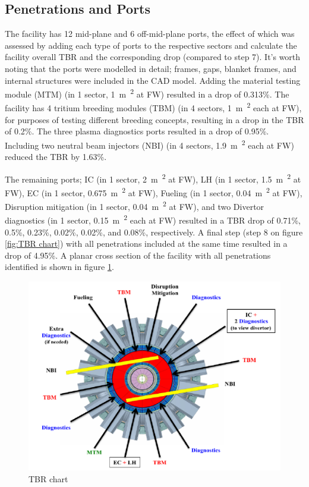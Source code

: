\documentclass[12pt, letterpaper]{elsarticle}
\begin{document}
\subsection{Penetrations and Ports} \label{Penetrations and Ports}
The facility has 12 mid-plane and 6 off-mid-plane ports, the effect of which was assessed by adding each type of ports to the respective sectors and calculate the facility overall TBR and the corresponding drop (compared to step 7). It's worth noting that the ports were modelled in detail; frames, gaps, blanket frames, and internal structures were included in the CAD model. Adding the material testing module (MTM) (in 1 sector, \SI{1}{m\textsuperscript{2}} at FW) resulted in a drop of 0.313\%. The facility has 4 tritium breeding modules (TBM) (in 4 sectors, \SI{1}{m\textsuperscript{2}} each at FW), for purposes of testing different breeding concepts, resulting in a drop in the TBR of 0.2\%. The three plasma diagnostics ports resulted in a drop of 0.95\%. Including two neutral beam injectors (NBI) (in 4 sectors, \SI{1.9}{m\textsuperscript{2}} each at FW) reduced the TBR by 1.63\%. \vspace{5mm}

The remaining ports; IC (in 1 sector, \SI{2}{m\textsuperscript{2}} at FW), LH (in 1 sector, \SI{1.5}{m\textsuperscript{2}} at FW), EC (in 1 sector, \SI{0.675}{m\textsuperscript{2}} at FW), Fueling (in 1 sector, \SI{0.04}{m\textsuperscript{2}} at FW), Disruption mitigation (in 1 sector, \SI{0.04}{m\textsuperscript{2}} at FW), and two Divertor diagnostics (in 1 sector, \SI{0.15}{m\textsuperscript{2}} each at FW) resulted in a TBR drop of 0.71\%, 0.5\%, 0.23\%, 0.02\%, 0.02\%, and 0.08\%, respectively. A final step (step 8 on figure \ref{fig:TBR chart}) with all penetrations included at the same time resulted in a drop of 4.95\%. A planar cross section of the facility with all penetrations identified is shown in figure \ref{fig:Ports}.
\begin{figure}[h!]
  \centering
  \includegraphics[scale=0.3]{../plots/ports.png}
  \caption{TBR chart}
  \label{fig:Ports}
\end{figure}
\end{document}
